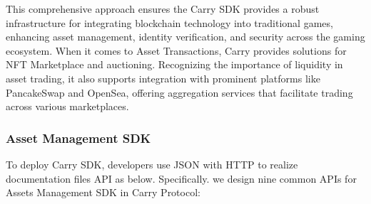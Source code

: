 This comprehensive approach ensures the Carry SDK provides a robust infrastructure for integrating blockchain technology into traditional games, enhancing asset management, identity verification, and security across the gaming ecosystem. When it comes to Asset Transactions, Carry provides solutions for NFT Marketplace and auctioning. Recognizing the importance of liquidity in asset trading, it also supports integration with prominent platforms like PancakeSwap and OpenSea, offering aggregation services that facilitate trading across various marketplaces.
\subsubsection{Asset Management SDK}
To deploy Carry SDK, developers use JSON with HTTP to realize documentation files API as below. Specifically. we design nine common APIs for Assets Management SDK in Carry Protocol:

